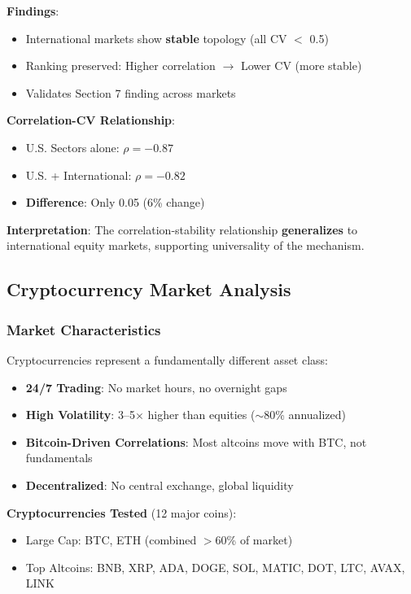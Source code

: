 \textbf{Findings}:
\begin{itemize}
\item \checkmark International markets show \textbf{stable} topology (all CV $<$ 0.5)
\item \checkmark Ranking preserved: Higher correlation $\rightarrow$ Lower CV (more stable)
\item \checkmark Validates Section 7 finding across markets
\end{itemize}

\textbf{Correlation-CV Relationship}:
\begin{itemize}
\item U.S. Sectors alone: $\rho = -0.87$
\item U.S. + International: $\rho = -0.82$
\item \textbf{Difference}: Only 0.05 (6\% change)
\end{itemize}

\textbf{Interpretation}: The correlation-stability relationship \textbf{generalizes} to international equity markets, supporting universality of the mechanism.

\subsection{Cryptocurrency Market Analysis}

\subsubsection{Market Characteristics}

Cryptocurrencies represent a fundamentally different asset class:

\begin{itemize}
\item \textbf{24/7 Trading}: No market hours, no overnight gaps
\item \textbf{High Volatility}: 3--5$\times$ higher than equities ($\sim$80\% annualized)
\item \textbf{Bitcoin-Driven Correlations}: Most altcoins move with BTC, not fundamentals
\item \textbf{Decentralized}: No central exchange, global liquidity
\end{itemize}

\textbf{Cryptocurrencies Tested} (12 major coins):
\begin{itemize}
\item Large Cap: BTC, ETH (combined $>$60\% of market)
\item Top Altcoins: BNB, XRP, ADA, DOGE, SOL, MATIC, DOT, LTC, AVAX, LINK
\end{itemize}

